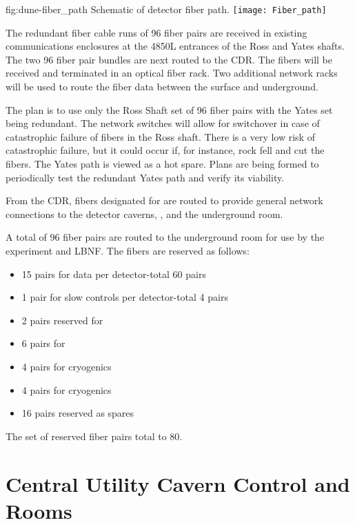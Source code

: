 \begin{dunefigure}{fig:dune-fiber_path}
  {Schematic of detector fiber path.}
  \texttt{[image: Fiber\_path]}
\end{dunefigure}

The redundant fiber cable runs of 96 fiber pairs are received in
existing communications enclosures at the 4850L entrances of the Ross
and Yates shafts.  The two 96 fiber pair bundles are next routed to
the CDR.  The fibers will be received and terminated in an optical
fiber rack. Two additional network racks will be used to route the
fiber data between the surface and underground.

The plan is to use only the Ross Shaft set of 96 fiber pairs with the
Yates set being redundant.  The network switches will allow for
switchover in case of catastrophic failure of fibers in the Ross
shaft. %
There is a very low risk of catastrophic failure, but it could occur
if, for instance, rock fell and cut the fibers.  The Yates path is
viewed as a hot spare. Plans are being formed to periodically test
the redundant Yates path and verify its viability.

From the CDR, fibers designated for  are routed to provide
general network connections to the detector caverns,  , and the underground  room.

A total of 96 fiber pairs are routed to the underground  room for
use by the  experiment and LBNF. The fibers are reserved as
follows:
\begin{itemize}
  \item 15 pairs for  data per detector-total 60 pairs
\item 1 pair for slow controls per detector-total 4 pairs
\item 2 pairs reserved for 
\item 6 pairs for 
\item 4 pairs for  cryogenics
\item 4 pairs for  cryogenics
  \item 16 pairs reserved as spares
\end{itemize}
The set of reserved fiber pairs total to 80.



\section{Central Utility Cavern Control and  Rooms}
\label{sec:fdsp-coord-cuc-daq}

